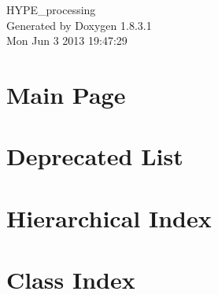 \documentclass{book}
\begin{document}
\hypersetup{pageanchor=false,citecolor=blue}
\begin{titlepage}
\vspace*{7cm}
\begin{center}
{\Large H\-Y\-P\-E\-\_\-processing }\\
\vspace*{1cm}
{\large Generated by Doxygen 1.8.3.1}\\
\vspace*{0.5cm}
{\small Mon Jun 3 2013 19:47:29}\\
\end{center}
\end{titlepage}
\clearemptydoublepage
{}
\tableofcontents
\clearemptydoublepage
{}
\hypersetup{pageanchor=true,citecolor=blue}
\chapter{Main Page}
\label{index}\hypertarget{index}{}
\chapter{Deprecated List}
\label{deprecated}
\hypertarget{deprecated}{}

\chapter{Hierarchical Index}

\chapter{Class Index}

\end{document}
